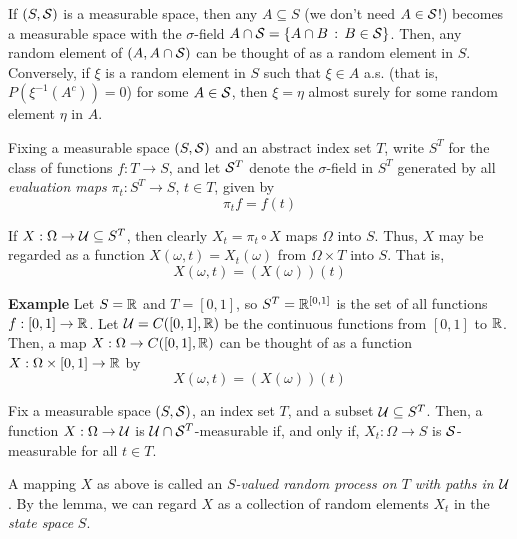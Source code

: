 
If $(S, \cal{S})$ is a measurable space, then any $A \subseteq S$ (we don't need $A \in \cal{S}$!) becomes a measurable space with the $\sigma$-field $A \cap \cal{S} = \{A \cap B \col B \in \cal{S}\}$. Then, any random element of $(A, A \cap \cal{S})$ can be thought of as a random element in $S$.\\

Conversely, if $\xi$ is a random element in $S$ such that $\xi \in A$ a.s. (that is, $P(\xi^{-1}(A^{c})) = 0$) for some $A \in \cal{S}$, then $\xi = \eta$ almost surely for some random element $\eta$ in $A$.

\begin{definition}
    Fixing a measurable space $(S, \cal{S})$ and an abstract index set $T$, write $S^{T}$ for the class of functions $f : T \to S$, and let $\cal{S}^{T}$ denote the $\sigma$-field in $S^{T}$ generated by all \emph{evaluation maps} $\pi_t : S^{T} \to S$, $t \in T$, given by
    \[ \pi_t f = f(t) \]
\end{definition}

If $X : \Omega \to \cal{U} \subseteq S^{T}$, then clearly $X_t = \pi_t \circ X$ maps $\Omega$ into $S$. Thus, $X$ may be regarded as a function $X(\omega, t) = X_t(\omega)$ from $\Omega \times T$ into $S$. That is,
\[ X(\omega, t) = (X(\omega))(t) \]

\begin{example}{\textbf{Example}}
    Let $S = \R$ and $T = [0, 1]$, so $S^{T} = \R^{[0, 1]}$ is the set of all functions $f : [0, 1] \to \R$. Let $\cal{U} = C([0, 1], \R)$ be the continuous functions from $[0, 1]$ to $\R$. Then, a map $X : \Omega \to C([0, 1], \R)$ can be thought of as a function $X : \Omega \times [0, 1] \to \R$ by
    \[ X(\omega, t) = (X(\omega))(t) \]
\end{example}

\begin{lemma}
    Fix a measurable space $(S, \cal{S})$, an index set $T$, and a subset $\cal{U} \subseteq S^{T}$. Then, a function $X : \Omega \to \cal{U}$ is $\cal{U} \cap \cal{S}^{T}$-measurable if, and only if, $X_t : \Omega \to S$ is $\cal{S}$-measurable for all $t \in T$.
\end{lemma}

\begin{definition}
    A mapping $X$ as above is called an \emph{$S$-valued random process on $T$ with paths in $\cal{U}$}. By the lemma, we can regard $X$ as a collection of random elements $X_t$ in the \emph{state space} $S$.
\end{definition}

